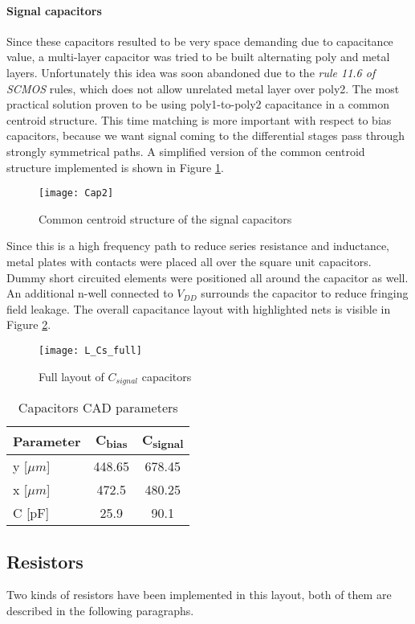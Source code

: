 \paragraph{Signal capacitors}
Since these capacitors resulted to be very space demanding due to capacitance value, a multi-layer capacitor was tried to be built alternating poly and metal layers. Unfortunately this idea was soon abandoned due to the \emph{rule 11.6 of SCMOS} rules, which does not allow unrelated metal layer over poly2. The most practical solution proven to be using poly1-to-poly2 capacitance in a common centroid structure. This time matching is more important with respect to bias capacitors, because we want signal coming to the differential stages pass through strongly symmetrical paths.
A simplified version of the common centroid structure implemented is shown in Figure \ref{Cap2}. 
\begin{figure}[H]
	\centering
	\texttt{[image: Cap2]}
	\caption{Common centroid structure of the signal capacitors}
	\label{Cap2}
\end{figure}
Since this is a high frequency path to reduce series resistance and inductance, metal plates with contacts were placed all over the square unit capacitors. Dummy short circuited elements were positioned all around the capacitor as well. An additional n-well connected to \(V_{DD}\) surrounds the capacitor to reduce fringing field leakage. The overall capacitance layout with highlighted nets is visible in Figure \ref{L_Cs_full}.
\begin{figure}[H]
	\centering
	\texttt{[image: L\_Cs\_full]}
	\caption{Full layout of \(C_{signal}\) capacitors}
	\label{L_Cs_full}
\end{figure}

\begin{table} [h]
	\label{tab:specs}
	\caption{Capacitors CAD parameters}
	\centering	
	\begin{tabular}{lcc} 
		\toprule 
		Parameter & C\textsubscript{bias}& C\textsubscript{signal}\\ 
		\midrule
		y [$\mu m$] &448.65	&678.45	\\
		x [$\mu m$]	&472.5	&480.25	\\
		C [pF] 		&25.9	&90.1	\\
		\bottomrule 
	\end{tabular}	
\end{table}
\newpage
\subsection{Resistors}
Two kinds of resistors have been implemented in this layout, both of them are described in the following paragraphs.
